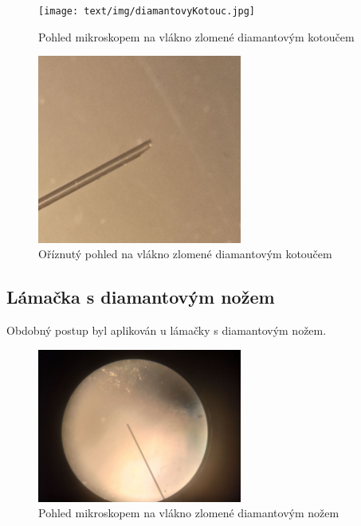    \begin{figure}[h!]
      \centering
      \texttt{[image: text/img/diamantovyKotouc.jpg]} 
      \caption{\label{fig:diamKot} Pohled mikroskopem na vlákno zlomené diamantovým kotoučem}
    \end{figure}

    \begin{figure}[h!]
      \centering
      \includegraphics[width=0.6\textwidth]{text/img/diamantovyKotouc-O.jpg}
      \caption{\label{fig:diamKot_O} Oříznutý pohled na vlákno zlomené diamantovým kotoučem}
    \end{figure}

  \newpage
  \clearpage

  \subsection{Lámačka s diamantovým nožem}
    Obdobný postup byl aplikován u lámačky s diamantovým nožem.

    \begin{figure}[h!]
      \centering
      \includegraphics[width=0.6\textwidth]{text/img/diamantovyNuz.jpg} 
      \caption{\label{fig:diamNuz} Pohled mikroskopem na vlákno zlomené diamantovým nožem}
    \end{figure}

